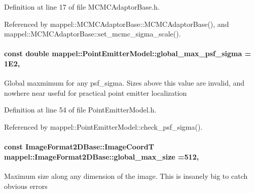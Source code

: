 Definition at line 17 of file M\+C\+M\+C\+Adaptor\+Base.\+h.



Referenced by mappel\+::\+M\+C\+M\+C\+Adaptor\+Base\+::\+M\+C\+M\+C\+Adaptor\+Base(), and mappel\+::\+M\+C\+M\+C\+Adaptor\+Base\+::set\+\_\+mcmc\+\_\+sigma\+\_\+scale().

\paragraph[{\texorpdfstring{global\+\_\+max\+\_\+psf\+\_\+sigma}{global_max_psf_sigma}}]{\setlength{\rightskip}{0pt plus 5cm}const double mappel\+::\+Point\+Emitter\+Model\+::global\+\_\+max\+\_\+psf\+\_\+sigma = 1\+E2\hspace{0.3cm}{\ttfamily [static]}, {\ttfamily [inherited]}}\hypertarget{classmappel_1_1PointEmitterModel_a5e79dba8966c25c4e9c675cd1a2cab70}{}\label{classmappel_1_1PointEmitterModel_a5e79dba8966c25c4e9c675cd1a2cab70}
Global maxmimum for any psf\+\_\+sigma. Sizes above this value are invalid, and nowhere near useful for practical point emitter localization 

Definition at line 54 of file Point\+Emitter\+Model.\+h.



Referenced by mappel\+::\+Point\+Emitter\+Model\+::check\+\_\+psf\+\_\+sigma().

\paragraph[{\texorpdfstring{global\+\_\+max\+\_\+size}{global_max_size}}]{\setlength{\rightskip}{0pt plus 5cm}const {\bf Image\+Format2\+D\+Base\+::\+Image\+CoordT} mappel\+::\+Image\+Format2\+D\+Base\+::global\+\_\+max\+\_\+size =512\hspace{0.3cm}{\ttfamily [static]}, {\ttfamily [inherited]}}\hypertarget{classmappel_1_1ImageFormat2DBase_a11c9bb87930f597dff17e9923b73bf5e}{}\label{classmappel_1_1ImageFormat2DBase_a11c9bb87930f597dff17e9923b73bf5e}
Maximum size along any dimension of the image. This is insanely big to catch obvious errors 

